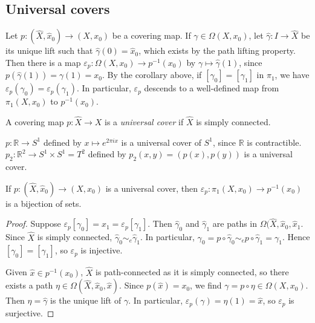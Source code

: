 \subsection{Universal covers}
Let \( p \colon (\hat X, \hat x_0) \to (X, x_0) \) be a covering map.
If \( \gamma \in \Omega(X,x_0) \), let \( \hat \gamma \colon I \to \hat X \) be its unique lift such that \( \hat \gamma(0) = \hat x_0 \), which exists by the path lifting property.
Then there is a map \( \varepsilon_p \colon \Omega(X,x_0) \to p^{-1}(x_0) \) by \( \gamma \mapsto \hat\gamma(1) \), since \( p(\hat\gamma(1)) = \gamma(1) = x_0 \).
By the corollary above, if \( [\gamma_0] = [\gamma_1] \) in \( \pi_1 \), we have \( \varepsilon_p(\gamma_0) = \varepsilon_p(\gamma_1) \).
In particular, \( \varepsilon_p \) descends to a well-defined map from \( \pi_1(X,x_0) \) to \( p^{-1}(x_0) \).
\begin{definition}
	A covering map \( p \colon \hat X \to X \) is a \emph{universal cover} if \( \hat X \) is simply connected.
\end{definition}
\begin{example}
	\( p \colon \mathbb R \to S^1 \) defined by \( x \mapsto e^{2 \pi i x} \) is a universal cover of \( S^1 \), since \( \mathbb R \) is contractible.
	\( p_2 \colon \mathbb R^2 \to S^1 \times S^1 = T^2 \) defined by \( p_2(x,y) = (p(x),p(y)) \) is a universal cover.
\end{example}
\begin{proposition}
	If \( p \colon (\hat X, \hat x_0) \to (X, x_0) \) is a universal cover, then \( \varepsilon_p \colon \pi_1(X,x_0) \to p^{-1}(x_0) \) is a bijection of sets.
\end{proposition}
\begin{proof}
	Suppose \( \varepsilon_p[\gamma_0] = \hat x_1 = \varepsilon_p[\gamma_1] \).
	Then \( \hat \gamma_0 \) and \( \hat \gamma_1 \) are paths in \( \Omega(\hat X, \hat x_0, \hat x_1 \).
	Since \( \hat X \) is simply connected, \( \hat \gamma_0 \sim_e \hat \gamma_1 \).
	In particular, \( \gamma_0 = p \circ \hat \gamma_0 \sim_e p \circ \hat \gamma_1 = \gamma_1 \).
	Hence \( [\gamma_0] = [\gamma_1] \), so \( \varepsilon_p \) is injective.

	Given \( \hat x \in p^{-1}(x_0) \), \( \hat X \) is path-connected as it is simply connected, so there exists a path \( \eta \in \Omega(\hat X, \hat x_0, \hat x) \).
	Since \( p(\hat x) = x_0 \), we find \( \gamma = p \circ \eta \in \Omega(X,x_0) \).
	Then \( \eta = \hat\gamma \) is the unique lift of \( \gamma \).
	In particular, \( \varepsilon_p(\gamma) = \eta(1) = \hat x \), so \( \varepsilon_p \) is surjective.
\end{proof}
